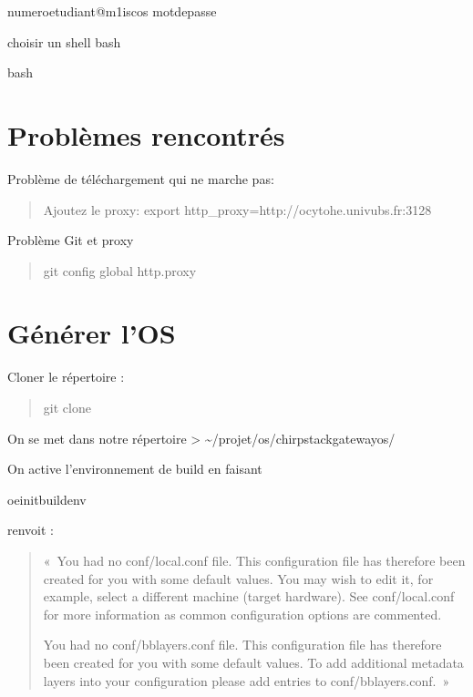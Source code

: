 \documentclass[letterpaper,10pt,french]{sphinxmanual}
\begin{document}
\begin{sphinxVerbatim}[commandchars=\\\{\}]
numeroetudiant@m1\PYGZhy{}isc\PYGZhy{}os
motdepasse
\end{sphinxVerbatim}

choisir un shell bash

\begin{sphinxVerbatim}[commandchars=\\\{\}]
bash
\end{sphinxVerbatim}


\section{Problèmes rencontrés}
\label{\detokenize{securisationGW:problemes-rencontres}}
Problème de téléchargement qui ne marche pas:
\begin{quote}

Ajoutez le proxy: export http\_proxy=http://ocytohe.univ\sphinxhyphen{}ubs.fr:3128
\end{quote}

Problème Git et proxy
\begin{quote}

git config \textendash{}global http.proxy 
\end{quote}


\section{Générer l’OS}
\label{\detokenize{securisationGW:generer-l-os}}
Cloner le répertoire :
\begin{quote}

git clone 
\end{quote}

On se met dans notre répertoire \textgreater{} \textasciitilde{}/projet/os/chirpstack\sphinxhyphen{}gateway\sphinxhyphen{}os/

On active l’environnement de build en faisant

\begin{sphinxVerbatim}[commandchars=\\\{\}]
 oe\PYGZhy{}init\PYGZhy{}build\PYGZhy{}env
\end{sphinxVerbatim}

renvoit :
\begin{quote}

« You had no conf/local.conf file. This configuration file has therefore been created for you with some default values.
You may wish to edit it, for example, select a different machine (target hardware). See conf/local.conf for more information as common configuration options are commented.

You had no conf/bblayers.conf file. This configuration file has therefore been created for you with some default values.
To add additional metadata layers into your configuration please add entries to conf/bblayers.conf. »
\end{quote}
\end{document}
